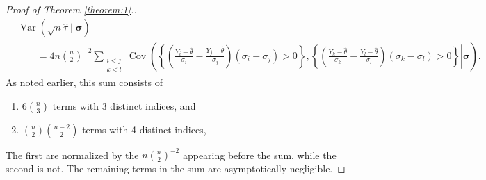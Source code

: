 \documentclass[12pt]{article}
\newtheorem{theorem}{Theorem}
\newcommand{\y}{Y}
\DeclareMathOperator{\diag}{diag}
\DeclareMathOperator{\V}{Var}
\DeclareMathOperator{\Cov}{Cov}
\begin{document}

\begin{proof}[Proof of Theorem \ref{theorem:1}.]
  \begin{align}
    &\V(\sqrt{n}\hat\tau\mid\pmb{\sigma})\\
    &\qquad =4n{n\choose 2}^{-2}\sum_{\substack{i<j\\k<l}}\Cov\left(\left.
    \left\{\left(\frac{\y_i-\hat\theta}{\sigma_i}-\frac{\y_j-\hat\theta}{\sigma_j}\right)(\sigma_i-\sigma_j)>0\right\},
      \left\{\left(\frac{\y_k-\hat\theta}{\sigma_k}-\frac{\y_l-\hat\theta}{\sigma_l}\right)(\sigma_k-\sigma_l)>0\right\}
    \right|\pmb{\sigma}\right).
  \end{align}
  As noted earlier, this sum consists of
  \begin{enumerate}
  \item $6{n\choose 3}$ terms with 3 distinct indices, and
  \item ${n\choose 2}{n-2\choose 2}$ terms with 4 distinct indices,
  \end{enumerate}
  The first are normalized by the $n{n\choose2}^{-2}$ appearing before the sum, while the second is not. The remaining terms in the sum are asymptotically negligible.


\end{proof}
\end{document}
